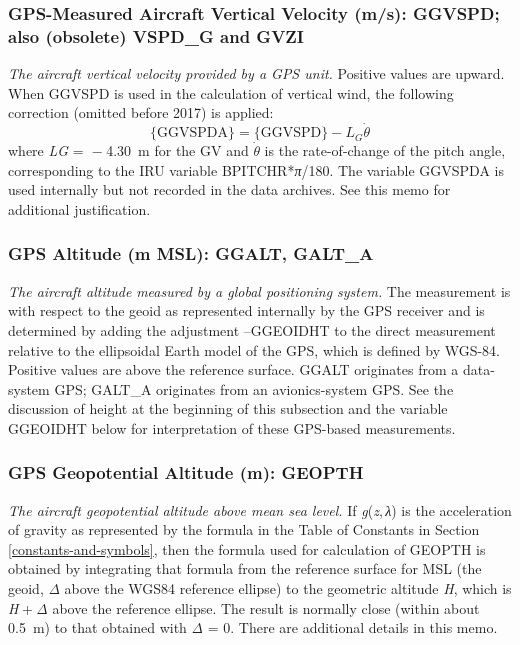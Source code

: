 \documentclass[
]{book}
\begin{document}
\hypertarget{ggvspd}{%
\subsubsection*{GPS-Measured Aircraft Vertical Velocity (m/s): GGVSPD; also (obsolete) VSPD\_G and GVZI}\label{ggvspd}}

\emph{The aircraft vertical velocity provided by a GPS unit.} Positive values are upward. When GGVSPD is used in the calculation of vertical wind, the following correction (omitted before 2017) is applied:
\begin{equation}
\mathrm{\{GGVSPDA\}} = \mathrm{\{GGVSPD\}}-L_{G}\dot{\theta}
\label{eq:GGVSPDA}
\end{equation}
where {\emph{L}\emph{G} =  − 4.30}~m for the GV and \(\dot{\theta}\) is the rate-of-change of the pitch angle, corresponding to the IRU variable BPITCHR*{\emph{π}}/180. The variable GGVSPDA is used internally but not recorded in the data archives. See this memo for additional justification.

\hypertarget{ggalt}{%
\subsubsection*{GPS Altitude (m MSL): GGALT, GALT\_A}\label{ggalt}}

\emph{The aircraft altitude} \emph{measured by a global positioning system.} The measurement is with respect to the geoid as represented internally by the GPS receiver and is determined by adding the adjustment --GGEOIDHT to the direct measurement relative to the ellipsoidal Earth model of the GPS, which is defined by WGS-84. Positive values are above the reference surface. GGALT originates from a data-system GPS; GALT\_A originates from an avionics-system GPS. See the discussion of height at the beginning of this subsection and the variable GGEOIDHT below for interpretation of these GPS-based measurements.

\hypertarget{geoph}{%
\subsubsection*{GPS Geopotential Altitude (m): GEOPTH}\label{geoph}}

\emph{The aircraft geopotential altitude above mean sea level.} If {\emph{g}(\emph{z}, \emph{λ})} is the acceleration of gravity as represented by the formula in the Table of Constants in Section \ref{constants-and-symbols}, then the formula used for calculation of GEOPTH is obtained by integrating that formula from the reference surface for MSL (the geoid, {\emph{Δ}} above the WGS84 reference ellipse) to the geometric altitude {\emph{H}}, which is {\emph{H} + \emph{Δ}} above the reference ellipse. The result is normally close (within about 0.5~m) to that obtained with {\emph{Δ} = 0}. There are additional details in this memo.
\end{document}
